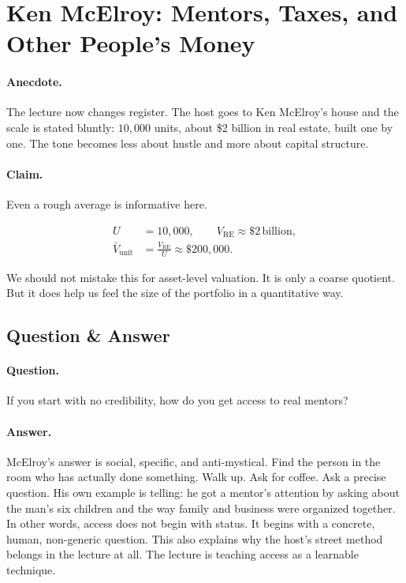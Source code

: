 \section{Ken McElroy: Mentors, Taxes, and Other People's Money}

\paragraph{Anecdote.} The lecture now changes register. The host goes to Ken McElroy's house and the scale is stated bluntly: \(10{,}000\) units, about \$2 billion in real estate, built one by one. The tone becomes less about hustle and more about capital structure.

\paragraph{Claim.} Even a rough average is informative here.

\begin{align}
U &= 10{,}000,\qquad V_{\text{RE}} \approx \$2\,\text{billion},\\
\bar V_{\text{unit}} &= \frac{V_{\text{RE}}}{U} \approx \$200{,}000.
\end{align}

We should not mistake this for asset-level valuation. It is only a coarse quotient. But it does help us feel the size of the portfolio in a quantitative way.

\subsection{Question \& Answer}

\paragraph{Question.} If you start with no credibility, how do you get access to real mentors?

\paragraph{Answer.} McElroy's answer is social, specific, and anti-mystical. Find the person in the room who has actually done something. Walk up. Ask for coffee. Ask a precise question. His own example is telling: he got a mentor's attention by asking about the man's six children and the way family and business were organized together. In other words, access does not begin with status. It begins with a concrete, human, non-generic question. This also explains why the host's street method belongs in the lecture at all. The lecture is teaching access as a learnable technique.

